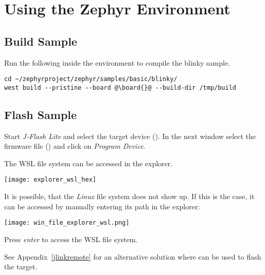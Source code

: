\newpage

\section{Using the Zephyr Environment}

\subsection{Build Sample}

Run the following inside the environment to compile the blinky sample.

\begin{lstlisting}
cd ~/zephyrproject/zephyr/samples/basic/blinky/
west build --pristine --board @\board{}@ --build-dir /tmp/build
\end{lstlisting}


\subsection{Flash Sample}

Start \emph{J-Flash Lite} and select the target device (\emph{\mcu{}}). In the next
window select the firmware file () and click on
\emph{Program Device}.


\begin{infobox}
  The WSL file system can be accessed in the explorer.
  \begin{center}
    \texttt{[image: explorer\_wsl\_hex]}
  \end{center}

  It is possible, that the \emph{Linux} file system does not show up. If this is
  the case, it can be accessed by manually entering its path in the explorer:
  \mono{\\\\wsl\$}
  \begin{center}
    \texttt{[image: win\_file\_explorer\_wsl.png]}
  \end{center}
  Press \emph{enter} to access the WSL file system.
\end{infobox}

See Appendix~\ref{jlinkremote} for an alternative solution where  can be used to flash the target.

